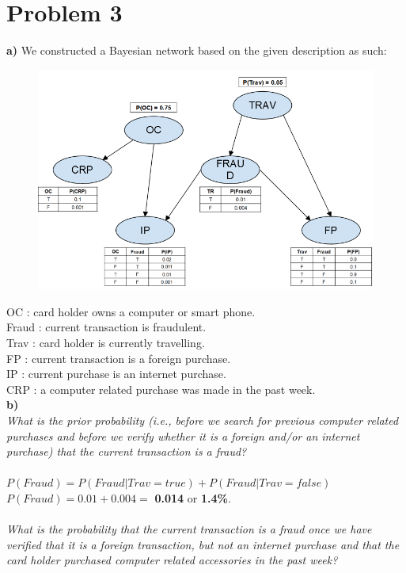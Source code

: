 \documentclass{article}
\begin{document}
\section{Problem 3}
\noindent
\textbf{a)} We constructed a Bayesian network based on the given description as such:\\
\noindent
\begin{figure}[H]
\centering
\includegraphics{images/3.png}
\end{figure}
\noindent
OC : card holder owns a computer or smart phone. \\
Fraud : current transaction is fraudulent. \\
Trav : card holder is currently travelling. \\
FP : current transaction is a foreign purchase. \\
IP : current purchase is an internet purchase. \\
CRP : a computer related purchase was made in the past week. \\
\newpage
\noindent
\textbf{b)} \\\textit{What is the prior probability (i.e., before we search for previous computer related purchases and before we verify whether it is a foreign and/or an internet purchase) that the current transaction is a fraud?}
\\\\
$P(Fraud) = P(Fraud | Trav = true) + P(Fraud | Trav = false)$\\
$P(Fraud) = 0.01 + 0.004 =$ \textbf{0.014} or \textbf{1.4\%}.
\\\\
\textit{What is the probability that the current transaction is a fraud once we have verified that it is a foreign transaction, but not an internet purchase and that the card holder purchased computer related accessories in the past week?}
\end{document}
